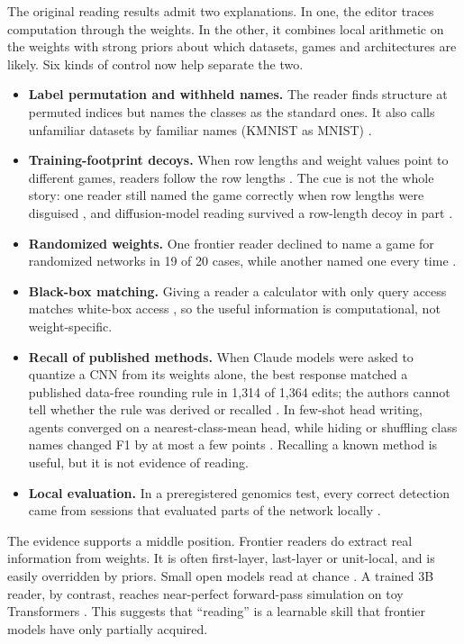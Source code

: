 The original reading results \citep{takehi2026sparks} admit two explanations. In one, the editor traces computation through the weights. In the other, it combines local arithmetic on the weights with strong priors about which datasets, games and architectures are likely. Six kinds of control now help separate the two.
\begin{itemize}[leftmargin=*,itemsep=2pt]
\item \textbf{Label permutation and withheld names.} The reader finds structure at permuted indices but names the classes as the standard ones. It also calls unfamiliar datasets by familiar names (KMNIST as MNIST) \citep{ax2611_08070}.
\item \textbf{Training-footprint decoys.} When row lengths and weight values point to different games, readers follow the row lengths \citep{zen24373915}. The cue is not the whole story: one reader still named the game correctly when row lengths were disguised \citep{zen24373915}, and diffusion-model reading survived a row-length decoy in part \citep{zen24373917}.
\item \textbf{Randomized weights.} One frontier reader declined to name a game for randomized networks in 19 of 20 cases, while another named one every time \citep{zen24373915}.
\item \textbf{Black-box matching.} Giving a reader a calculator with only query access matches white-box access \citep{ax2611_07847}, so the useful information is computational, not weight-specific.
\item \textbf{Recall of published methods.} When Claude models were asked to quantize a CNN from its weights alone, the best response matched a published data-free rounding rule in 1{,}314 of 1{,}364 edits; the authors cannot tell whether the rule was derived or recalled \citep{ax2611_33031}. In few-shot head writing, agents converged on a nearest-class-mean head, while hiding or shuffling class names changed F1 by at most a few points \citep{ax2611_28105}. Recalling a known method is useful, but it is not evidence of reading.
\item \textbf{Local evaluation.} In a preregistered genomics test, every correct detection came from sessions that evaluated parts of the network locally \citep{zen24040591}.
\end{itemize}
The evidence supports a middle position. Frontier readers do extract real information from weights. It is often first-layer, last-layer or unit-local, and is easily overridden by priors. Small open models read at chance \citep{zen24047726}. A trained 3B reader, by contrast, reaches near-perfect forward-pass simulation on toy Transformers \citep{ax2610_07334}. This suggests that ``reading'' is a learnable skill that frontier models have only partially acquired.


